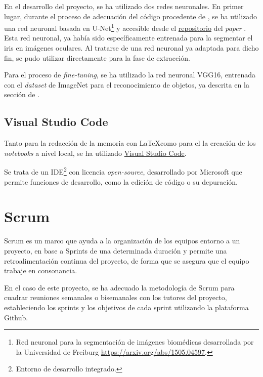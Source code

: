 En el desarrollo del proyecto, se ha utilizado dos redes neuronales. En primer lugar, durante el proceso de adecuación del código procedente de \cite{tfg_iris_2020}, se ha utilizado una red neuronal basada en U-Net\footnote{Red neuronal para la segmentación de imágenes biomédicas desarrollada por la Universidad de Freiburg \url{https://arxiv.org/abs/1505.04597}.} y accesible desde el \href{https://github.com/jus390/U-net-Iris-segmentation}{repositorio} del \textit{paper} \cite{lozej_end--end_2018}. Esta red neuronal, ya había sido
específicamente entrenada para la segmentar el iris en imágenes oculares. Al tratarse de una red neuronal ya adaptada para dicho fin, se pudo utilizar directamente para la fase de extracción.

Para el proceso de \textit{fine-tuning}, se ha utilizado la red neuronal VGG16, entrenada con el \textit{dataset} de ImageNet para el reconocimiento de objetos, ya descrita en la sección de .

\subsection{Visual Studio Code}

Tanto para la redacción de la memoria con \LaTeX como para el la creación de los \textit{notebooks} a nivel local, se ha utilizado \href{https://code.visualstudio.com/}{Visual Studio Code}.

Se trata de un IDE\footnote{Entorno de desarrollo integrado.} con licencia \textit{open-source}, desarrollado por Microsoft que permite funciones de desarrollo, como la edición de código o su depuración.

\section{Scrum}
Scrum es un marco que ayuda a la organización de los equipos entorno a un proyecto, en base a Sprints de una determinada duración y permite una retroalimentación
continua del proyecto, de forma que se asegura que el equipo trabaje en consonancia.

En el caso de este proyecto, se ha adecuado la metodología de Scrum para cuadrar reuniones semanales o bisemanales con los tutores del proyecto, estableciendo
los sprints y los objetivos de cada sprint utilizando la plataforma Github.





